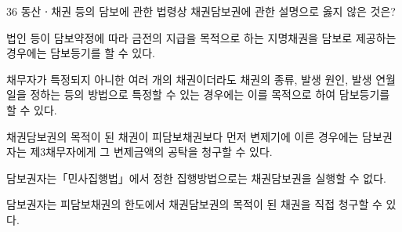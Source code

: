 \begin{question}{36}
동산ㆍ채권 등의 담보에 관한 법령상 채권담보권에 관한 설명으로 옳지 않은 것은?
\begin{choices}
  \item 법인 등이 담보약정에 따라 금전의 지급을 목적으로 하는 지명채권을 담보로 제공하는 경우에는 담보등기를 할 수 있다.
  \item 채무자가 특정되지 아니한 여러 개의 채권이더라도 채권의 종류, 발생 원인, 발생 연월일을 정하는 등의 방법으로 특정할 수 있는 경우에는 이를 목적으로 하여 담보등기를 할 수 있다.
  \item 채권담보권의 목적이 된 채권이 피담보채권보다 먼저 변제기에 이른 경우에는 담보권자는 제3채무자에게 그 변제금액의 공탁을 청구할 수 있다.
  \item 담보권자는「민사집행법」에서 정한 집행방법으로는 채권담보권을 실행할 수 없다.
  \item 담보권자는 피담보채권의 한도에서 채권담보권의 목적이 된 채권을 직접 청구할 수 있다.
\end{choices}
\end{question}
